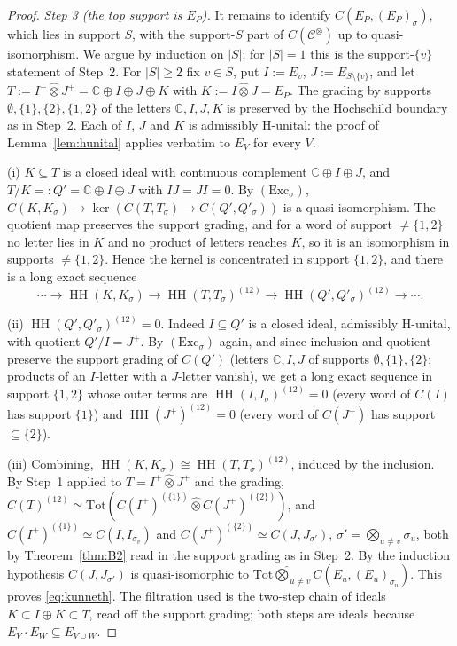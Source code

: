 \documentclass[11pt]{amsart}
\theoremstyle{definition}
\theoremstyle{remark}
\newcommand{\C}{\mathbb C}
\newcommand{\HH}{\operatorname{HH}}
\begin{document}
\begin{proof}
\emph{Step 3 (the top support is $E_P$).}  It remains to identify
$C(E_P,(E_P)_{\sigma})$, which lies in support $S$, with the support-$S$ part
of $C(\mathcal C^{\otimes})$ up to quasi-isomorphism.  We argue by induction
on $|S|$; for $|S|=1$ this is the support-$\{v\}$ statement of Step~2.  For
$|S|\ge2$ fix $v\in S$, put $I:=E_v$, $J:=E_{S\setminus\{v\}}$, and let
$T:=I^{+}\widehat\otimes J^{+}=\C\oplus I\oplus J\oplus K$ with
$K:=I\widehat\otimes J=E_P$.  The grading by supports $\emptyset,\{1\},\{2\},
\{1,2\}$ of the letters $\C,I,J,K$ is preserved by the Hochschild boundary as
in Step~2.  Each of $I$, $J$ and $K$ is admissibly H-unital: the proof of
Lemma~\ref{lem:hunital} applies verbatim to $E_V$ for every $V$.

(i) $K\subseteq T$ is a closed ideal with continuous complement
$\C\oplus I\oplus J$, and $T/K=:Q'=\C\oplus I\oplus J$ with $IJ=JI=0$.  By
$(\mathrm{Exc}_{\sigma})$, $C(K,K_{\sigma})\to\ker(C(T,T_{\sigma})\to
C(Q',Q'_{\sigma}))$ is a quasi-isomorphism.  The quotient map preserves the
support grading, and for a word of support $\ne\{1,2\}$ no letter lies in $K$
and no product of letters reaches $K$, so it is an isomorphism in supports
$\ne\{1,2\}$.  Hence the kernel is concentrated in support $\{1,2\}$, and there
is a long exact sequence
\[
\cdots\to\HH(K,K_{\sigma})\to\HH(T,T_{\sigma})^{(12)}\to
\HH(Q',Q'_{\sigma})^{(12)}\to\cdots .
\]

(ii) $\HH(Q',Q'_{\sigma})^{(12)}=0$.  Indeed $I\subseteq Q'$ is a closed ideal,
admissibly H-unital, with quotient $Q'/I=J^{+}$.  By $(\mathrm{Exc}_{\sigma})$
again, and since inclusion and quotient preserve the support grading of
$C(Q')$ (letters $\C,I,J$ of supports $\emptyset,\{1\},\{2\}$; products of an
$I$-letter with a $J$-letter vanish), we get a long exact sequence in support
$\{1,2\}$ whose outer terms are $\HH(I,I_{\sigma})^{(12)}=0$ (every word of
$C(I)$ has support $\{1\}$) and $\HH(J^{+})^{(12)}=0$ (every word of $C(J^{+})$
has support $\subseteq\{2\}$).

(iii) Combining, $\HH(K,K_{\sigma})\cong\HH(T,T_{\sigma})^{(12)}$, induced by
the inclusion.  By Step~1 applied to $T=I^{+}\widehat\otimes J^{+}$ and the
grading, $C(T)^{(12)}\simeq\mathrm{Tot}(C(I^{+})^{(\{1\})}\widehat\otimes
C(J^{+})^{(\{2\})})$, and $C(I^{+})^{(\{1\})}\simeq C(I,I_{\sigma_v})$ and
$C(J^{+})^{(\{2\})}\simeq C(J,J_{\sigma'})$, $\sigma'=\bigotimes_{u\ne
v}\sigma_u$, both by Theorem~\ref{thm:B2} read in the support grading as in
Step~2.  By the induction hypothesis $C(J,J_{\sigma'})$ is quasi-isomorphic to
$\mathrm{Tot}\widehat\bigotimes_{u\ne v}C(E_u,(E_u)_{\sigma_u})$.  This proves
\eqref{eq:kunneth}.  The filtration used is the two-step chain of ideals
$K\subset I\oplus K\subset T$, read off the support grading; both steps are
ideals because $E_V\cdot E_W\subseteq E_{V\cup W}$.
\end{proof}
\end{document}
